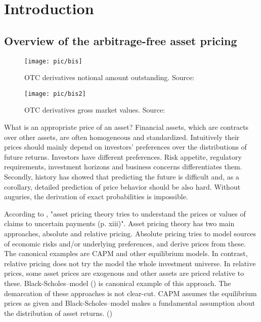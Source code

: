 \chapter{Introduction}

\section{Overview of the arbitrage-free asset pricing}

\begin{figure}[H]
	\centering
	\texttt{[image: pic/bis]}
	\caption{OTC derivatives notional amount outstanding. Source: \cite{bis2019statistics}}
	\label{fig:bis2019statistics}
\end{figure}

\begin{figure}[H]
	\centering
	\texttt{[image: pic/bis2]}
	\caption{OTC derivatives gross market values. Source: \cite{bis2019statistics}}
	\label{fig:bis2019statistics2}
\end{figure}

What is an appropriate price of an asset? Financial assets, which are contracts over other assets, are often homogeneous and standardized. Intuitively their prices should mainly depend on investors' preferences over the distributions of future returns. Investors have different preferences.  Risk appetite, regulatory requirements, investment horizons and business concerns differentiates them. Secondly, history has showed that predicting the future is difficult and, as a corollary, detailed prediction of price behavior should be also hard. Without auguries, the derivation of exact probabilities is impossible. 

According to \textcite{cochrane2009asset}, "asset pricing theory tries to understand the prices or values of claims to uncertain payments (p. xiii)". Asset pricing theory has two main approaches, absolute and relative pricing. Absolute pricing tries to model sources of economic risks and/or underlying preferences, and derive prices from these. The canonical examples are CAPM and other equilibrium models. In contrast, relative pricing does not try the model the whole investment universe. In relative prices, some asset prices are exogenous and other assets are priced relative to these. Black-Scholes--model (\cite{blackscholes1973pricing}) is canonical example of this approach. The demarcation of these approaches is not clear-cut. CAPM assumes the equilibrium prices as given and Black-Scholes--model makes a fundamental assumption about the distribution of asset returns. (\cite[pp. xiii--xiv]{cochrane2009asset})

